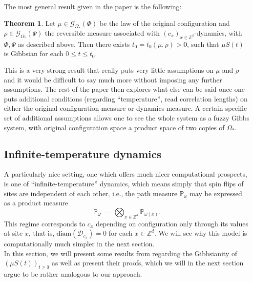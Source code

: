 \documentclass[12pt]{article}
\newcommand{\D}{\mathcal{D}}
\newcommand{\G}{\mathcal{G}}
\renewcommand{\P}{\mathbb{P}}
\newcommand{\Z}{\mathbb{Z}}
\newcommand{\1}{\mathbbm{1}}
\newcommand{\5}{\vspace{0.5cm}}
\theoremstyle{definition}
\newtheorem{thm}{Theorem}[section]
\begin{document}
The most general result given in the paper is the following:

\begin{thm}
Let $\mu\in\G_{\Omega_*}(\Phi)$ be the law of the original configuration and $\rho\in\G_{\Omega_*}(\Psi)$ the reversible measure associated with $(c_x)_{x\in\Z^d}$-dynamics, with $\Phi,\Psi$ as described above. Then there exists $t_0=t_0(\mu,\rho)>0$, such that $\mu S(t)$ is Gibbsian for each $0\leq t\leq t_0$. 
\end{thm}

This is a very strong result that really puts very little assumptions on $\mu$ and $\rho$ and it would be difficult to say much more without imposing any further assumptions. The rest of the paper then explores what else can be said once one puts additional conditions (regarding ``temperature'', read correlation lengths) on either the original configuration measure or dynamics measure. A certain specific set of additional assumptions allows one to see the whole system as a fuzzy Gibbs system, with original configuration space a product space of two copies of $\Omega_*$.
 

\subsection{Infinite-temperature dynamics}

A particularly nice setting, one which offers much nicer computational prospects, is one of ``infinite-temperature'' dynamics, which means simply that spin flips of sites are independent of each other, i.e., the path measure $\P_\omega$ may be expressed as a product measure
$$\P_\omega ~=~ \bigotimes_{x\in\Z^d}\P_{\omega(x)}.$$
This regime corresponds to $c_x$ depending on configuration only through its values at site $x$, that is, $\mathrm{diam}(\D_{c_x})=0$ for each $x\in\Z^d$. We will see why this model is computationally much simpler in the next section. \\

In this section, we will present some results from \cite{EFHR} regarding the Gibbsianity of $(\mu S(t))_{t\geq 0}$ as well as present their proofs, which we will in the next section argue to be rather analogous to our approach. \\
\end{document}
